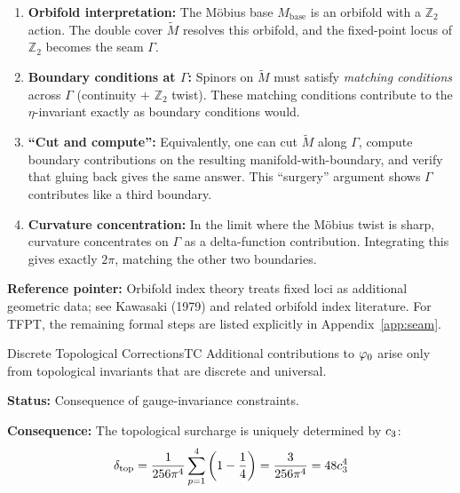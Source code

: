 \begin{tcolorbox}[colback=green!3, colframe=green!50!black, 
    title={\textbf{Proof Sketch for $\phitree = 1/(6\pi)$ (with Postulate A3)}}, fonttitle=\bfseries\small]
\begin{enumerate}[leftmargin=1.5em, topsep=2pt, itemsep=1pt]
    \item \textbf{Orbifold interpretation:} The M\"obius base $M_{\text{base}}$ is an orbifold 
        with a $\mathbb{Z}_2$ action. The double cover $\widetilde{M}$ resolves this orbifold, 
        and the fixed-point locus of $\mathbb{Z}_2$ becomes the seam $\Gamma$.
    \item \textbf{Boundary conditions at $\Gamma$:} Spinors on $\widetilde{M}$ must satisfy 
        \emph{matching conditions} across $\Gamma$ (continuity + $\mathbb{Z}_2$ twist). 
        These matching conditions contribute to the $\eta$-invariant exactly as boundary 
        conditions would.
    \item \textbf{``Cut and compute'':} Equivalently, one can cut $\widetilde{M}$ along $\Gamma$, 
        compute boundary contributions on the resulting manifold-with-boundary, and verify that 
        gluing back gives the same answer. This ``surgery'' argument shows $\Gamma$ contributes 
        like a third boundary.
    \item \textbf{Curvature concentration:} In the limit where the M\"obius twist is sharp, 
        curvature concentrates on $\Gamma$ as a delta-function contribution. Integrating this 
        gives exactly $2\pi$, matching the other two boundaries.
\end{enumerate}

\textbf{Reference pointer:} Orbifold index theory treats fixed loci as additional geometric data; 
see Kawasaki (1979) and related orbifold index literature. For TFPT, the remaining formal steps 
are listed explicitly in Appendix~\ref{app:seam}.
\end{tcolorbox}

\begin{axiom}{Discrete Topological Corrections}{TC}
Additional contributions to $\varphi_0$ arise only from topological invariants 
that are discrete and universal.

\tcblower
\textbf{Status:} Consequence of gauge-invariance constraints.

\textbf{Consequence:} The topological surcharge is uniquely determined by $c_3$:
\begin{equation}
    \delta_{\mathrm{top}} 
    = \frac{1}{256\pi^4}\sum_{p=1}^{4}\left(1-\frac{1}{4}\right)
    = \frac{3}{256\pi^4}
    = 48c_3^4
\end{equation}
\end{axiom}

